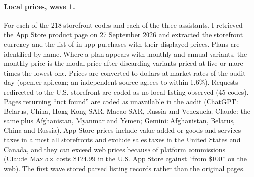 \documentclass[11pt]{article}
\theoremstyle{definition}
\theoremstyle{remark}
\begin{document}
\paragraph{Local prices, wave 1.} For each of the 218 storefront codes and each of the three assistants, I retrieved the App Store product page on 27 September 2026 and extracted the storefront currency and the list of in-app purchases with their displayed prices. Plans are identified by name. Where a plan appears with monthly and annual variants, the monthly price is the modal price after discarding variants priced at five or more times the lowest one. Prices are converted to dollars at market rates of the audit day (open.er-api.com; an independent source agrees to within 1.6\%). Requests redirected to the U.S. storefront are coded as no local listing observed (45 codes). Pages returning ``not found'' are coded as unavailable in the audit (ChatGPT: Belarus, China, Hong Kong SAR, Macao SAR, Russia and Venezuela; Claude: the same plus Afghanistan, Myanmar and Yemen; Gemini: Afghanistan, Belarus, China and Russia). App Store prices include value-added or goods-and-services taxes in almost all storefronts and exclude sales taxes in the United States and Canada, and they can exceed web prices because of platform commissions (Claude Max 5$\times$ costs \$124.99 in the U.S. App Store against ``from \$100'' on the web). The first wave stored parsed listing records rather than the original pages.
\end{document}
